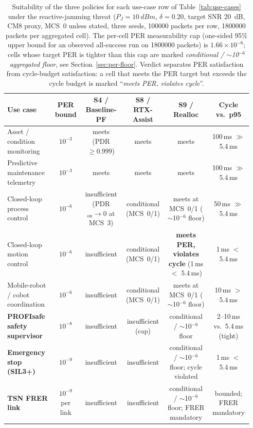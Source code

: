 \documentclass[journal,onecolumn,11pt,a4paper]{IEEEtran}
\begin{document}
\begin{table}[t]
  \centering
  \caption{Suitability of the three policies for each
  use-case row of Table~\ref{tab:use-cases} under the reactive-jamming
  threat ($P_J=\SI{10}{dBm}$, $\delta=0.20$, target SNR \SI{20}{dB},
  CM8 proxy, MCS~0 unless stated, three seeds, \num{100000} packets
  per row, \num{1800000} packets per aggregated cell). The
  per-cell PER measurability cap (one-sided 95\% upper bound for an
  observed all-success run on \num{1800000} packets) is
  $1.66\times 10^{-6}$; cells whose target PER is tighter than this
  cap are marked \emph{conditional / $\sim$10$^{-6}$ aggregated
  floor}, see Section~\ref{sec:per-floor}. Verdict separates PER
  satisfaction from cycle-budget satisfaction: a cell that meets
  the PER target but exceeds the cycle budget is marked
  ``\emph{meets PER, violates cycle}''.}
  \label{tab:suitability}
  \footnotesize
  \begin{tabular}{l c c c c c}
    \toprule
    Use case & PER bound &
      \multicolumn{1}{c}{S4 / Baseline-PF} &
      \multicolumn{1}{c}{S8 / RTX-Assist} &
      \multicolumn{1}{c}{S9 / Realloc} &
      Cycle vs.\ p95 \\
    \midrule
    Asset / condition monitoring
      & $10^{-3}$
      & meets (PDR $\geq 0.999$)
      & meets
      & meets
      & 100\,ms $\gg$ 5.4\,ms \\
    Predictive maintenance telemetry
      & $10^{-3}$
      & meets
      & meets
      & meets
      & 100\,ms $\gg$ 5.4\,ms \\
    Closed-loop process control
      & $10^{-6}$
      & insufficient (PDR$_{\mathrm{on}}\to 0$ at MCS~3)
      & conditional (MCS~0/1)
      & meets at MCS~0/1 ($\sim$10$^{-6}$ floor)
      & 50\,ms $\gg$ 5.4\,ms \\
    Closed-loop motion control
      & $10^{-6}$
      & insufficient
      & conditional (MCS~0/1)
      & \textbf{meets PER, violates cycle} (1\,ms $<$ 5.4\,ms)
      & 1\,ms $<$ 5.4\,ms \\
    Mobile-robot / cobot coordination
      & $10^{-6}$
      & insufficient
      & conditional (MCS~0/1)
      & meets at MCS~0/1 ($\sim$10$^{-6}$ floor)
      & 10\,ms $>$ 5.4\,ms \\
    \midrule
    \textbf{PROFIsafe safety supervisor}
      & $10^{-8}$
      & insufficient
      & insufficient (cap)
      & conditional / $\sim$10$^{-6}$ floor
      & 2--10\,ms vs.\ 5.4\,ms (tight) \\
    \textbf{Emergency stop (SIL3+)}
      & $10^{-9}$
      & insufficient
      & insufficient
      & conditional / $\sim$10$^{-6}$ floor; cycle violated
      & 1\,ms $<$ 5.4\,ms \\
    \textbf{TSN FRER link}
      & $10^{-9}$ per link
      & insufficient
      & insufficient
      & conditional / $\sim$10$^{-6}$ floor; FRER mandatory
      & bounded; FRER mandatory \\
    \bottomrule
  \end{tabular}
\end{table}
\end{document}
